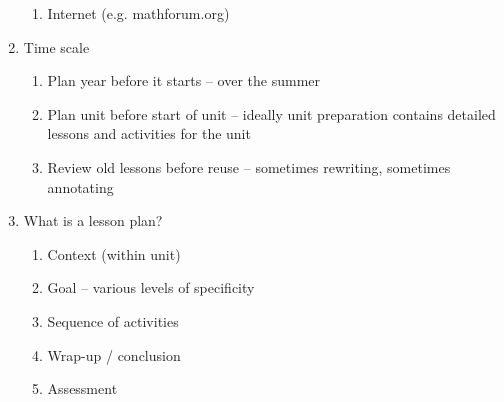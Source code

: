 \documentclass[11pt,letter]{article}
\begin{document}
\begin{enumerate}
\begin{enumerate}
			\item Internet (e.g. mathforum.org)

		\end{enumerate}

	\item Time scale
		\begin{enumerate}
			\item Plan year before it starts -- over the summer

			\item Plan unit before start of unit -- ideally unit preparation
				contains detailed lessons and activities for the unit

			\item Review old lessons before reuse -- sometimes rewriting,
				sometimes annotating

		\end{enumerate}

	\item What is a lesson plan?
		\begin{enumerate}
			\item Context (within unit)

			\item Goal -- various levels of specificity

			\item Sequence of activities

			\item Wrap-up / conclusion

			\item Assessment

		\end{enumerate}

\end{enumerate}
\end{document}
